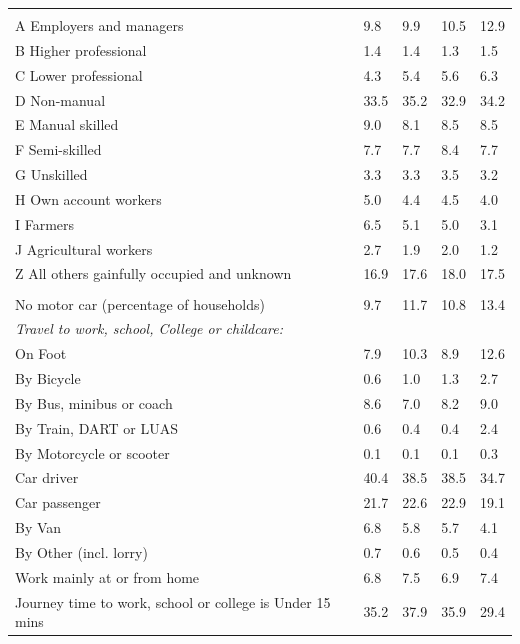 \documentclass{article}
\begin{document}
\begin{table}[h]
\begin{tabular}{KTTTT}
\hline
    \\ 
    \hline
A Employers and managers &  9.8&  9.9& 10.5& 12.9\\
B Higher professional & 1.4& 1.4& 1.3& 1.5\\
C Lower professional & 4.3& 5.4& 5.6& 6.3\\
D Non-manual & 33.5& 35.2& 32.9& 34.2\\
E Manual skilled & 9.0& 8.1& 8.5& 8.5\\
F Semi-skilled & 7.7& 7.7& 8.4& 7.7\\
G Unskilled & 3.3& 3.3& 3.5& 3.2\\
H Own account workers & 5.0& 4.4& 4.5& 4.0\\
I Farmers & 6.5& 5.1& 5.0& 3.1\\
J Agricultural workers & 2.7& 1.9& 2.0& 1.2\\
Z All others gainfully occupied and unknown & 16.9& 17.6& 18.0& 17.5\\
\hline
{}\hline
    \\ 
    \hline
No motor car (percentage of households) &  9.7& 11.7& 10.8& 
13.4\\
    \hline 
\emph{Travel to work, school, College or childcare:} & & & \\
\quad On Foot &  7.9& 10.3&  8.9& 12.6\\ 
\quad By Bicycle & 0.6& 1.0& 1.3& 2.7\\ 
\quad By Bus, minibus or coach & 8.6& 7.0& 8.2& 9.0\\
\quad By Train, DART or LUAS & 0.6& 0.4& 0.4& 2.4\\
\quad By Motorcycle or scooter & 0.1& 0.1& 0.1& 0.3\\
\quad Car driver & 40.4 & 38.5& 38.5& 34.7\\
\quad Car passenger & 21.7& 22.6& 22.9& 19.1\\
\quad By Van & 6.8& 5.8& 5.7& 4.1\\
\quad By Other (incl. lorry) & 0.7& 0.6& 0.5& 0.4\\
    \hline
Work mainly at or from home & 6.8& 7.5& 6.9& 7.4\\
Journey time to work, school or college is Under 15 mins & 35.2& 37.9& 35.9& 29.4\\

\end{tabular}
\end{table}
\end{document}

